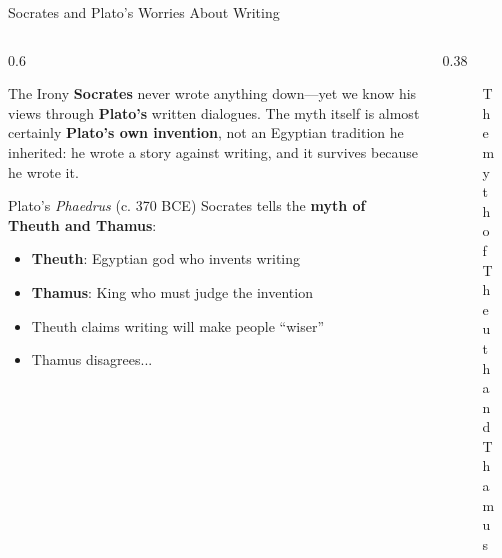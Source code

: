 \documentclass[aspectratio=169,11pt]{beamer}
\begin{document}
\begin{frame}[shrink=8]{Socrates and Plato's Worries About Writing}
\begin{columns}
\begin{column}{0.6\textwidth}
\begin{block}{The Irony}
\textbf{Socrates} never wrote anything down---yet we know his views through \textbf{Plato's} written dialogues. The myth itself is almost certainly \textbf{Plato's own invention}, not an Egyptian tradition he inherited: he wrote a story against writing, and it survives because he wrote it.
\end{block}

\vspace{0.3em}
\begin{exampleblock}{Plato's \textit{Phaedrus} (c. 370 BCE)}
Socrates tells the \textbf{myth of Theuth and Thamus}:
\begin{itemize}
  \item \textbf{Theuth}: Egyptian god who invents writing
  \item \textbf{Thamus}: King who must judge the invention
  \item Theuth claims writing will make people ``wiser''
  \item Thamus disagrees...
\end{itemize}
\end{exampleblock}
\end{column}

\begin{column}{0.38\textwidth}
\begin{figure}
\caption{The myth of Theuth and Thamus}
\end{figure}
\end{column}
\end{columns}
\end{frame}
\end{document}
